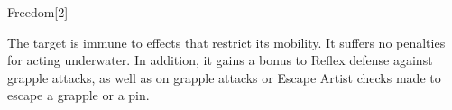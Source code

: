 \begin{spellsection}{Freedom}[2]
    \begin{spellheader}
    \end{spellheader}
    \begin{spellcontent}
        \begin{spelltargetinginfo}
        \end{spelltargetinginfo}
        \begin{spelleffects}
            \spelleffect The target is immune to effects that restrict its mobility. It suffers no penalties for acting underwater. In addition, it gains a  bonus to Reflex defense against grapple attacks, as well as on grapple attacks or Escape Artist checks made to escape a grapple or a pin.
            \spelldur \durshort
        \end{spelleffects}
    \end{spellcontent}
    \begin{spellfooter}
        \miscastrandom
    \end{spellfooter}
    \begin{spellaugments}
    \end{spellaugments}
\end{spellsection}

